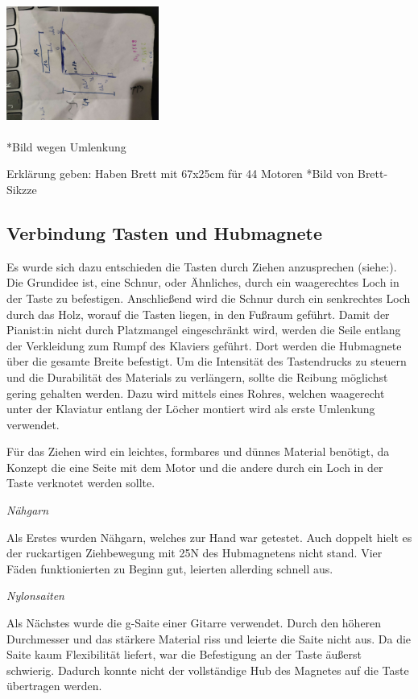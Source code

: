 \includegraphics [width=5cm, height=4cm,angle=-90] {img/skizze_Umlenkung}

*Bild wegen Umlenkung

Erklärung geben: Haben Brett mit 67x25cm für 44 Motoren
*Bild von Brett-Sikzze



\subsection{Verbindung Tasten und Hubmagnete}

Es wurde sich dazu entschieden die Tasten durch Ziehen anzusprechen (siehe:).
Die Grundidee ist, eine Schnur, oder Ähnliches, durch ein waagerechtes Loch in der Taste zu befestigen.
Anschließend wird die Schnur durch ein senkrechtes Loch durch das Holz, worauf die Tasten liegen, in den Fußraum geführt.
Damit der Pianist:in nicht durch Platzmangel eingeschränkt wird, werden die Seile entlang der Verkleidung zum Rumpf des Klaviers geführt.
Dort werden die Hubmagnete über die gesamte Breite befestigt.
Um die Intensität des Tastendrucks zu steuern und die Durabilität des Materials zu verlängern, sollte die Reibung möglichst gering gehalten werden.
Dazu wird mittels eines Rohres, welchen waagerecht unter der Klaviatur entlang der Löcher montiert wird als erste Umlenkung verwendet.


Für das Ziehen wird ein leichtes, formbares und dünnes Material benötigt, da Konzept die eine Seite mit dem Motor und die andere durch ein Loch in der Taste verknotet werden sollte.

\textit{Nähgarn}

Als Erstes wurden Nähgarn, welches zur Hand war getestet.
Auch doppelt hielt es der ruckartigen Ziehbewegung mit 25N des Hubmagnetens nicht stand.
Vier Fäden funktionierten zu Beginn gut, leierten allerding schnell aus.

\textit{Nylonsaiten}

Als Nächstes wurde die g-Saite einer Gitarre verwendet.
Durch den höheren Durchmesser und das stärkere Material riss und leierte die Saite nicht aus.
Da die Saite kaum Flexibilität liefert, war die Befestigung an der Taste äußerst schwierig.
Dadurch konnte nicht der vollständige Hub des Magnetes auf die Taste übertragen werden.

